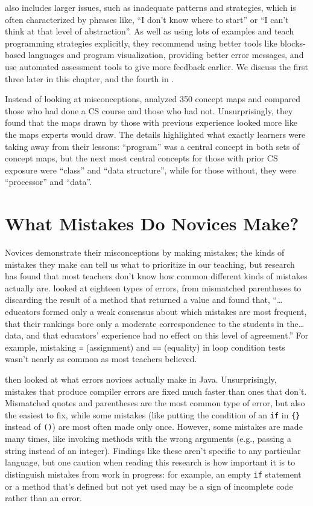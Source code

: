 \cite{Qian2017} also includes larger issues, such as inadequate
patterns and strategies, which is often characterized by phrases like,
``I don't know where to start'' or ``I can't think at that level of
abstraction''.  As well as using lots of examples and teach
programming strategies explicitly, they recommend using better tools
like blocks-based languages and program visualization, providing
better error messages, and use automated assessment tools to give more
feedback earlier.  We discuss the first three later in this chapter,
and the fourth in .

Instead of looking at misconceptions, \cite{Muhl2016} analyzed 350
concept maps and compared those who had done a CS course and those who
had not.  Unsurprisingly, they found that the maps drawn by those with
previous experience looked more like the maps experts would draw.  The
details highlighted what exactly learners were taking away from their
lessons: ``program'' was a central concept in both sets of concept
maps, but the next most central concepts for those with prior CS
exposure were ``class'' and ``data structure'', while for those
without, they were ``processor'' and ``data''.

\section{What Mistakes Do Novices Make?}\label{s:pck-mistakes}

Novices demonstrate their misconceptions by making mistakes; the kinds
of mistakes they make can tell us what to prioritize in our teaching,
but research has found that most teachers don't know how common
different kinds of mistakes actually are.  \cite{Brow2014} looked at
eighteen types of errors, from mismatched parentheses to discarding
the result of a method that returned a value and found that,
``{\ldots}educators formed only a weak consensus about which mistakes
are most frequent, that their rankings bore only a moderate
correspondence to the students in the{\ldots}data, and that educators'
experience had no effect on this level of agreement.''  For example,
mistaking \texttt{=} (assignment) and \texttt{==} (equality) in loop
condition tests wasn't nearly as common as most teachers believed.

\cite{Alta2015} then looked at what errors novices actually make in
Java.  Unsurprisingly, mistakes that produce compiler errors are fixed
much faster than ones that don't.  Mismatched quotes and parentheses
are the most common type of error, but also the easiest to fix, while
some mistakes (like putting the condition of an \texttt{if} in
\texttt{\{\}} instead of \texttt{()}) are most often made only once.
However, some mistakes are made many times, like invoking methods with
the wrong arguments (e.g., passing a string instead of an integer).
Findings like these aren't specific to any particular language, but
one caution when reading this research is how important it is to
distinguish mistakes from work in progress: for example, an empty
\texttt{if} statement or a method that's defined but not yet used may
be a sign of incomplete code rather than an error.

